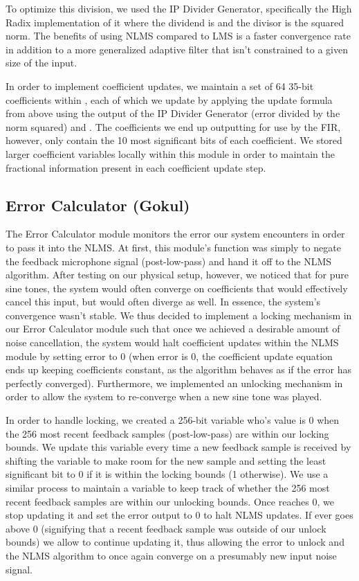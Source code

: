 \documentclass{fpgairpods}
\begin{document}
To optimize this division, we used the IP Divider Generator, specifically the High Radix implementation of it where the dividend is  and the divisor is the squared norm. The benefits of using NLMS compared to LMS is a faster convergence rate in addition to a more generalized adaptive filter that isn't constrained to a given size of the input. 

In order to implement coefficient updates, we maintain a set of 64 35-bit coefficients within , each of which we update by applying the update formula from above using the output of the IP Divider Generator  (error divided by the norm squared) and . The coefficients we end up outputting for use by the FIR, however, only contain the 10 most significant bits of each  coefficient. We stored larger coefficient variables locally within this module in order to maintain the fractional information present in each coefficient update step.

\subsection{Error Calculator (Gokul)}
The Error Calculator module monitors the error our system encounters in order to pass it into the NLMS. At first, this module's function was simply to negate the feedback microphone signal (post-low-pass) and hand it off to the NLMS algorithm. After testing on our physical setup, however, we noticed that for pure sine tones, the system would often converge on coefficients that would effectively cancel this input, but would often diverge as well. In essence, the system's convergence wasn't stable. We thus decided to implement a locking mechanism in our Error Calculator module such that once we achieved a desirable amount of noise cancellation, the system would halt coefficient updates within the NLMS module by setting error to 0 (when error is 0, the coefficient update equation ends up keeping coefficients constant, as the algorithm behaves as if the error has perfectly converged). Furthermore, we implemented an unlocking mechanism in order to allow the system to re-converge when a new sine tone was played.

In order to handle locking, we created a 256-bit variable  who's value is 0 when the 256 most recent feedback samples (post-low-pass) are within our locking bounds. We update this variable every time a new feedback sample is received by shifting the variable to make room for the new sample and setting the least significant bit to 0 if it is within the locking bounds (1 otherwise). We use a similar process to maintain a variable  to keep track of whether the 256 most recent feedback samples are within our unlocking bounds. Once  reaches 0, we stop updating it and set the error output to 0 to halt NLMS updates. If  ever goes above 0 (signifying that a recent feedback sample was outside of our unlock bounds) we allow  to continue updating it, thus allowing the error to unlock and the NLMS algorithm to once again converge on a presumably new input noise signal.
\end{document}
